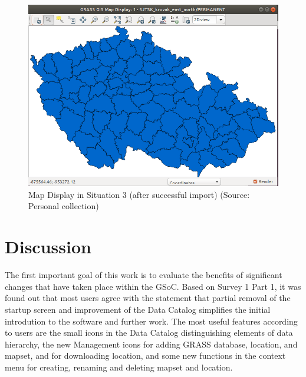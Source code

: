 \documentclass[a4paper,10pt,twoside]{article}
\begin{document}
\newpage
\begin{figure}[hbt!] 
\begin{center}
\includegraphics[width=15cm]{../pictures/mapdisplay3.png} 
\caption[Map Display in Situation 3 (after successful import)]{Map
  Display in Situation 3 (after successful import) (Source: Personal
  collection)}
\label{fig:mapdisplay3}
\end{center}
\end{figure}




\newpage
\vspace*{-1cm}
\section*{Discussion}
\noindent
\large

\noindent The first important goal of this work is to evaluate the
benefits of significant changes that have taken place within the
GSoC. Based on Survey 1 Part 1, it was found out that most users agree
with the statement that partial removal of the startup screen and
improvement of the Data Catalog simplifies the initial introdution to
the software and further work. The most useful features according to
users are the small icons in the Data Catalog distinguishing elements
of data hierarchy, the new Management icons for adding GRASS database,
location, and mapset, and for downloading location, and some
new functions in the context menu for creating, renaming and deleting
mapset and location.
\end{document}

